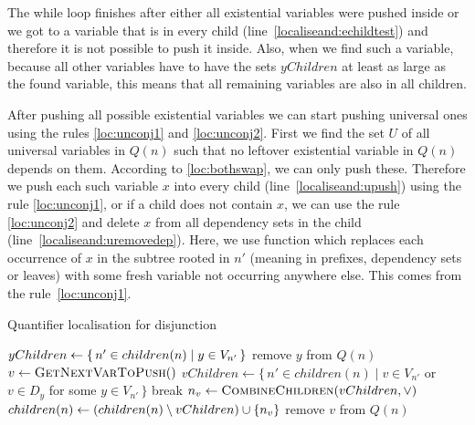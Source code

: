 \documentclass[
  digital, %
  color,
  twoside, %
  table,   %
  nolof,     %
  nolot,     %
]{fithesis3}
\let\setbuilder\set
\newcommand{\simpleset}[1]{\{{#1}\}}
\renewcommand{\set}[1]{\normalexpandarg\IfSubStr{#1}{|}{\setbuilder{#1}}{\simpleset{#1}}}
\theoremstyle{definition}
\theoremstyle{remark}
\newcommand{\vars}[1]{V_{#1}}
\newcommand{\prefix}[1]{Q({#1})}
\newcommand{\eprefix}[1]{Q_{\exists}(#1)}
\newcommand{\children}[1]{children({#1})}
\begin{document}
The while loop finishes after either all existential variables were pushed inside or we got to a variable that is in every child (line~\ref{localiseand:echildtest}) and therefore it is not possible to push it inside. Also, when we find such a variable, because all other variables have to have the sets $yChildren$ at least as large as the found variable, this means that all remaining variables are also in all children.

After pushing all possible existential variables we can start pushing universal ones using the rules \eqref{loc:unconj1} and \eqref{loc:unconj2}. First we find the set $U$ of all universal variables in $\prefix{n}$ such that no leftover existential variable in $\prefix{n}$ depends on them. According to \eqref{loc:bothswap}, we can only push these. Therefore we push each such variable $x$ into every child (line~\ref{localiseand:upush}) using the rule \eqref{loc:unconj1}, or if a child does not contain $x$, we can use the rule \eqref{loc:unconj2} and delete $x$ from all dependency sets in the child (line~\ref{localiseand:uremovedep}). Here, we use function  which replaces each occurrence of $x$ in the subtree rooted in $n'$ (meaning in prefixes, dependency sets or leaves) with some fresh variable not occurring anywhere else. This comes from the rule~\eqref{loc:unconj1}.

\begin{algorithm}[t!]
  \caption{Quantifier localisation for disjunction}
  \label{alg:localiseor}
  \begin{algorithmic}[1]
      \ForAll{$y \in \eprefix{n}$}\label{localiseor:estart}
        \State $yChildren \gets \set{n' \in \children{n} | y \in \vars{n'}}$\label{localiseor:egetchildren}
        \label{localiseor:checkconditions}
            \State {}\label{localiseor:epush}
            \State {}
          \EndFor
          \State remove $y$ from $\prefix{n}$
        \EndIf
      \EndFor\label{localiseor:eend}
      \While{$\prefix{n}$ is not empty}\label{localiseor:bstart}
        \State $v \gets \Call{GetNextVarToPush}{\null}$\label{localiseor:getnextvar}
        \State $vChildren \gets \{\,n' \in \children{n} \mid v \in \vars{n'}$  or  $v \in D_y$ for\label{localiseor:bgetchildren}
        \Statex \hspace{9cm} some $y \in \vars{n'}\,\}$
        \If{$vChildren = \children{n}$}\label{localiseor:bcompare}
          \State break
        \Else
          \State $n_v \gets \Call{CombineChildren}{vChildren, {\lor}}$\label{localiseor:bcombine}
          \State $\children{n} \gets (\children{n} \setminus vChildren) \cup \set{n_v}$\label{localiseor:bupdatechildren}
          \State {}\label{localiseor:bpush}
          \State remove $v$ from $\prefix{n}$\label{localiseor:bremove}
        \EndIf
      \EndWhile\label{localiseor:bend}
    \EndFunction
  \end{algorithmic}
\end{algorithm}
\end{document}
